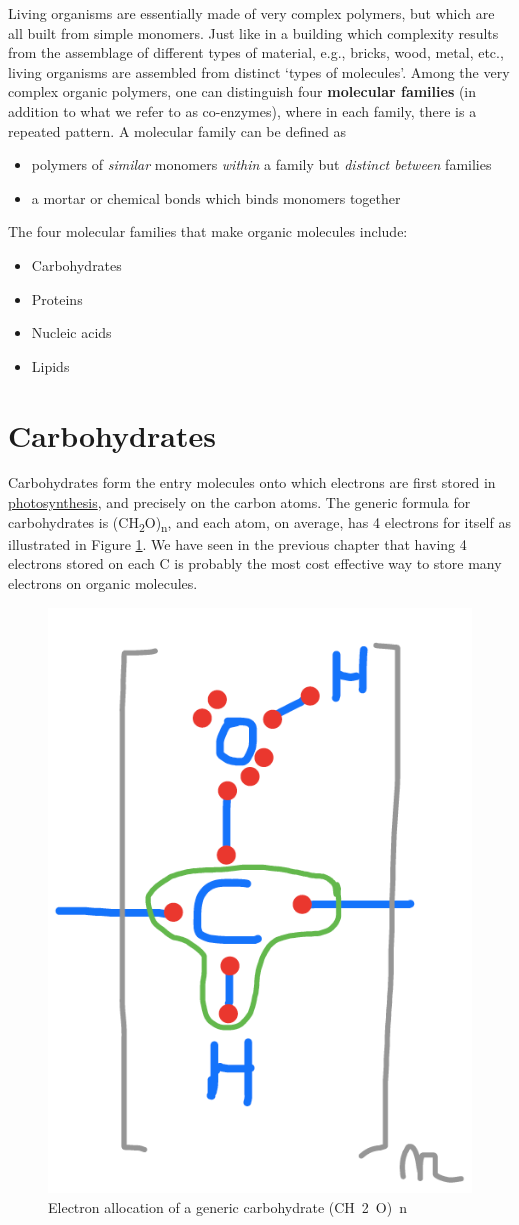 \documentclass[]{book}
\providecommand{\tightlist}{%
  \setlength{\itemsep}{0pt}\setlength{\parskip}{0pt}}
\theoremstyle{definition}
\theoremstyle{definition}
\theoremstyle{definition}
\theoremstyle{remark}
\begin{document}
Living organisms are essentially made of very complex polymers, but
which are all built from simple monomers. Just like in a building which
complexity results from the assemblage of different types of material,
e.g., bricks, wood, metal, etc., living organisms are assembled from
distinct `types of molecules'. Among the very complex organic polymers,
one can distinguish four \textbf{molecular families} (in addition to
what we refer to as co-enzymes), where in each family, there is a
repeated pattern. A molecular family can be defined as

\begin{itemize}
\tightlist
\item
  polymers of \emph{similar} monomers \emph{within} a family but
  \emph{distinct between} families
\item
  a mortar or chemical bonds which binds monomers together
\end{itemize}

The four molecular families that make organic molecules include:

\begin{itemize}
\tightlist
\item
  Carbohydrates
\item
  Proteins
\item
  Nucleic acids
\item
  Lipids
\end{itemize}

\section{Carbohydrates}\label{carbohydrates}

Carbohydrates form the entry molecules onto which electrons are first
stored in \protect\hyperlink{photosynthesis}{photosynthesis}, and
precisely on the carbon atoms. The generic formula for carbohydrates is
(CH\textsubscript{2}O)\textsubscript{n}, and each atom, on average, has
4 electrons for itself as illustrated in Figure
\ref{fig:elecalloc-CH2O}. We have seen in the previous chapter that
having 4 electrons stored on each C is probably the most cost effective
way to store many electrons on organic molecules.

\begin{figure}

{\centering \includegraphics[width=0.2\linewidth]{pictures/ElecAlloc_CH2O} 

}

\caption{Electron allocation of a generic carbohydrate (CH~2~O)~n~}\label{fig:elecalloc-CH2O}
\end{figure}
\end{document}
